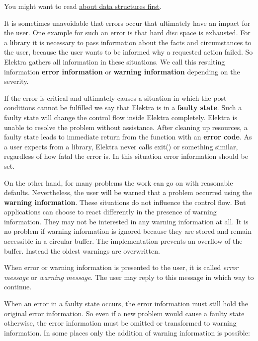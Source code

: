 You might want to read \hyperlink{doc_dev_data-structures_md}{about data structures first}.

It is sometimes unavoidable that errors occur that ultimately have an impact for the user. One example for such an error is that hard disc space is exhausted. For a library it is necessary to pass information about the facts and circumstances to the user, because the user wants to be informed why a requested action failed. So Elektra gathers all information in these situations. We call this resulting information {\bfseries error information} or {\bfseries warning information} depending on the severity.

If the error is critical and ultimately causes a situation in which the post conditions cannot be fulfilled we say that Elektra is in a {\bfseries faulty state}. Such a faulty state will change the control flow inside Elektra completely. Elektra is unable to resolve the problem without assistance. After cleaning up resources, a faulty state leads to immediate return from the function with an {\bfseries error code}. As a user expects from a library, Elektra never calls {\ttfamily exit()} or something similar, regardless of how fatal the error is. In this situation error information should be set.

On the other hand, for many problems the work can go on with reasonable defaults. Nevertheless, the user will be warned that a problem occurred using the {\bfseries warning information}. These situations do not influence the control flow. But applications can choose to react differently in the presence of warning information. They may not be interested in any warning information at all. It is no problem if warning information is ignored because they are stored and remain accessible in a circular buffer. The implementation prevents an overflow of the buffer. Instead the oldest warnings are overwritten.

When error or warning information is presented to the user, it is called {\itshape error message} or {\itshape warning message}. The user may reply to this message in which way to continue.

When an error in a faulty state occurs, the error information must still hold the original error information. So even if a new problem would cause a faulty state otherwise, the error information must be omitted or transformed to warning information. In some places only the addition of warning information is possible\+:


